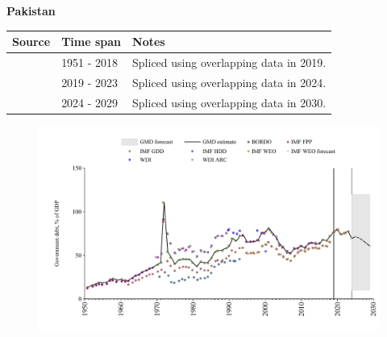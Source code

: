 \documentclass[12pt,a4paper,landscape]{article}
\begin{document}
\begin{adjustbox}{max totalsize={\paperwidth}{\paperheight},center}
\begin{minipage}[t][\textheight][t]{\textwidth}
\vspace*{0.5cm}
{}
\begin{center}
{\Large\bfseries Pakistan}
\end{center}
\vspace{0.5cm}
\begin{table}[H]
\centering
\small
\begin{tabular}{|l|l|l|}
\hline
\textbf{Source} & \textbf{Time span} & \textbf{Notes} \\
\hline
\rowcolor{white}\cite{IMF_GDD}& 1951 - 2018 &Spliced using overlapping data in 2019.\\
\rowcolor{lightgray}\cite{IMF_FPP}& 2019 - 2023 &Spliced using overlapping data in 2024.\\
\rowcolor{white}\cite{IMF_WEO_forecast}& 2024 - 2029 &Spliced using overlapping data in 2030.\\
\hline
\end{tabular}
\end{table}
\begin{figure}[H]
\centering
\includegraphics[width=\textwidth,height=0.6\textheight,keepaspectratio]{graphs/PAK_govdebt_GDP.pdf}
\end{figure}
\end{minipage}
\end{adjustbox}
\end{document}
